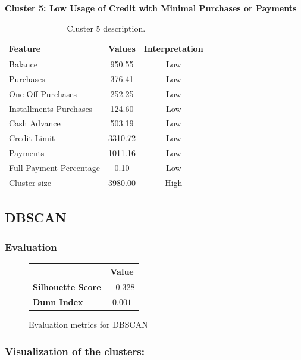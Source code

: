 \begin{center}
\centering
\textbf{Cluster 5: Low Usage of Credit with Minimal Purchases or Payments}
\begin{table}[H]
\centering
\begin{tabular}{|l|c|c|}
\hline
\textbf{Feature} & \textbf{Values} & \textbf{Interpretation} \\ \hline
Balance & 950.55 & Low \\ \hline
Purchases & 376.41 & Low \\ \hline
One-Off Purchases & 252.25 & Low \\ \hline
Installments Purchases & 124.60 & Low \\ \hline
Cash Advance & 503.19 & Low \\ \hline
Credit Limit & 3310.72 & Low \\ \hline
Payments & 1011.16 & Low \\ \hline
Full Payment Percentage & 0.10 & Low \\ \hline
Cluster size & 3980.00 & High \\ \hline
\end{tabular}
\caption{Cluster 5 description.}
\end{table}
\end{center}

\subsection{DBSCAN}

\subsubsection{Evaluation}

\begin{figure}[H]
    \centering
    \begin{tabular}{|l|c|}
        \hline
        \rowcolor{gray!50}
        & Value \\ \hline
        \textbf{Silhouette Score} & $-0.328$ \\ \hline
        \textbf{Dunn Index} & $0.001$ \\ \hline
    \end{tabular}
    \caption{Evaluation metrics for DBSCAN}\label{fig:DBSCAN_evaluation}
\end{figure}

\subsubsection{Visualization of the clusters:}

